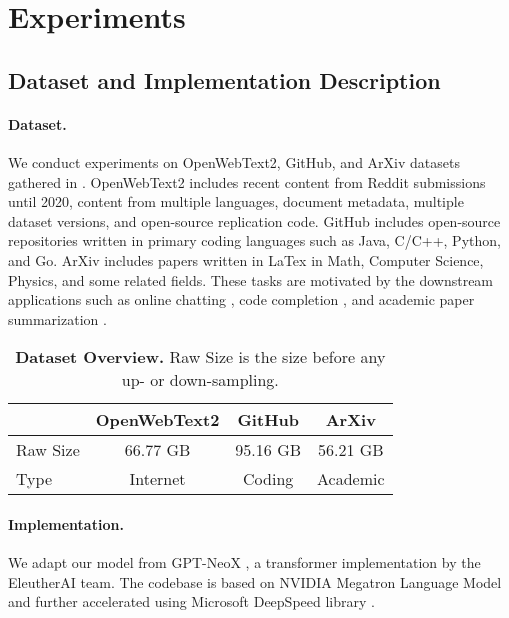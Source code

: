 \section{Experiments}
\label{sec:experi}

\subsection{Dataset and Implementation Description}
\paragraph{Dataset.} We conduct experiments on OpenWebText2, GitHub, and ArXiv datasets gathered in \citet{gao2020pile}. OpenWebText2 includes recent content from Reddit submissions until 2020, content from multiple languages, document metadata, multiple dataset versions, and open-source replication code. GitHub includes open-source repositories written in primary coding languages such as Java, C/C++, Python, and Go. ArXiv includes papers written in LaTex in Math, Computer Science, Physics, and some related fields. These tasks are motivated by the downstream applications such as online chatting \citep{roller2021recipes}, code completion \citep{chen2021codex}, and academic paper summarization \citep{zhang2020pegasus}.
\begin{table}[!ht]
    \centering
    \caption{\textbf{Dataset Overview.} Raw Size is the size before any up- or down-sampling.}
    \begin{tabular}{lccc}
    \hline\hline
    & OpenWebText2 & GitHub & ArXiv\\ \hline
    Raw Size & 66.77 GB & 95.16 GB & 56.21 GB\\
    Type & Internet & Coding & Academic\\
    \hline\hline
    \end{tabular}
    \label{tab:dataset}
    \vspace{-3mm}
\end{table}

\paragraph{Implementation.} We adapt our model from GPT-NeoX \citep{gpt-neox}, a transformer implementation by the EleutherAI team. The codebase is based on NVIDIA Megatron Language Model \citep{shoeybi2019megatron} and further accelerated using Microsoft DeepSpeed library \citep{rasley2020deepspeed}.

